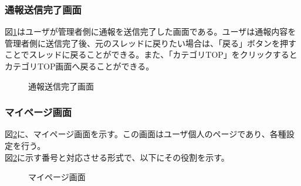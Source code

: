 \documentclass[a4j]{jarticle}
\begin{document}
\subsubsection{通報送信完了画面}
図\ref{fig:report_ok}はユーザが管理者側に通報を送信完了した画面である。ユーザは通報内容を管理者側に送信完了後、元のスレッドに戻りたい場合は、「戻る」ボタンを押すことでスレッドに戻ることができる。また、「カテゴリTOP」をクリックするとカテゴリTOP画面へ戻ることができる。
\begin{figure}[H]
\begin{center}
\caption{通報送信完了画面}
\label{fig:report_ok}
\end{center}
\end{figure}


\subsubsection{マイページ画面}
図\ref{fig:mypage}に、マイページ画面を示す。この画面はユーザ個人のページであり、各種設定を行う。\\
図\ref{fig:mypage}に示す番号と対応させる形式で、以下にその役割を示す。

\begin{figure}[H]
\centering
{}
\caption{マイページ画面}
\label{fig:mypage}
\end{figure}
\end{document}
